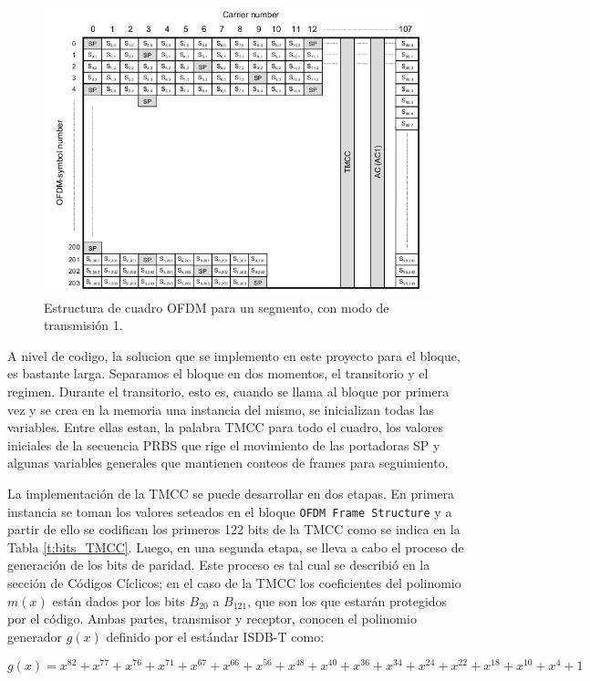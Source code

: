 \begin{figure}[!h]
	\centering
	\includegraphics[scale=0.5]{figuras/cap05/ofdm_frame}
	\caption{\label{f:ofdm_frame} Estructura de cuadro OFDM para un segmento, con modo de transmisión 1.}
\end{figure}

A nivel de codigo, la solucion que se implemento en este proyecto para el bloque, es bastante larga. Separamos el bloque en dos momentos, el transitorio y el regimen. Durante el transitorio, esto es, cuando se llama al bloque por primera vez y se crea en la memoria una instancia del mismo, se inicializan todas las variables. Entre ellas estan, la palabra TMCC para todo el cuadro, los valores iniciales de la secuencia PRBS que rige el movimiento de las portadoras SP y algunas variables generales que mantienen conteos de frames para seguimiento.

La implementación de la TMCC se puede desarrollar en dos etapas. En primera instancia se toman los valores seteados en el bloque \verb|OFDM Frame Structure| y a partir de ello se codifican los primeros 122 bits de la TMCC como se indica en la Tabla \ref{t:bits_TMCC}. Luego, en una segunda etapa, se lleva a cabo el proceso de generación de los bits de paridad. Este proceso es tal cual se describió en la sección de Códigos Cíclicos; en el caso de la TMCC los coeficientes del polinomio $m(x)$ están dados por los bits $B_{20}$ a $B_{121}$, que son los que estarán protegidos por el código. Ambas partes, transmisor y receptor, conocen el polinomio generador $g(x)$ definido por el estándar ISDB-T como:

\begin{equation}
g(x) = x^{82}+x^{77}+x^{76}+x^{71}+x^{67}+x^{66}+x^{56}+x^{48}+x^{40}+x^{36}+x^{34}+x^{24}+x^{22}+x^{18}+x^{10}+x^{4}+1
\end{equation}

